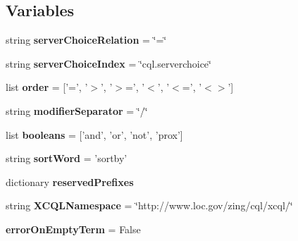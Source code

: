 \subsection*{Variables}
\begin{DoxyCompactItemize}
\item 
\hypertarget{namespacecheshire3_1_1cql_parser_af64d12b2765265d5bd547dfe567afb9c}{string {\bfseries server\-Choice\-Relation} = \char`\"{}=\char`\"{}}\label{namespacecheshire3_1_1cql_parser_af64d12b2765265d5bd547dfe567afb9c}

\item 
\hypertarget{namespacecheshire3_1_1cql_parser_a99a09921c9f500dad45dc168928f0a26}{string {\bfseries server\-Choice\-Index} = \char`\"{}cql.\-serverchoice\char`\"{}}\label{namespacecheshire3_1_1cql_parser_a99a09921c9f500dad45dc168928f0a26}

\item 
\hypertarget{namespacecheshire3_1_1cql_parser_a8a7c3235bbeca560ff1677553c1cbdfe}{list {\bfseries order} = \mbox{[}'=', '$>$', '$>$=', '$<$', '$<$=', '$<$$>$'\mbox{]}}\label{namespacecheshire3_1_1cql_parser_a8a7c3235bbeca560ff1677553c1cbdfe}

\item 
\hypertarget{namespacecheshire3_1_1cql_parser_a4cdfc9d9ef73d190be2d9af8d792f542}{string {\bfseries modifier\-Separator} = \char`\"{}/\char`\"{}}\label{namespacecheshire3_1_1cql_parser_a4cdfc9d9ef73d190be2d9af8d792f542}

\item 
\hypertarget{namespacecheshire3_1_1cql_parser_a5a7616bb34ce5a60de0a7b74cce7907c}{list {\bfseries booleans} = \mbox{[}'and', 'or', 'not', 'prox'\mbox{]}}\label{namespacecheshire3_1_1cql_parser_a5a7616bb34ce5a60de0a7b74cce7907c}

\item 
\hypertarget{namespacecheshire3_1_1cql_parser_af1b0fe898bb693d6c996c79a926754d3}{string {\bfseries sort\-Word} = 'sortby'}\label{namespacecheshire3_1_1cql_parser_af1b0fe898bb693d6c996c79a926754d3}

\item 
dictionary {\bfseries reserved\-Prefixes}
\item 
\hypertarget{namespacecheshire3_1_1cql_parser_a849869b94409127d85263f0c60d87ed6}{string {\bfseries X\-C\-Q\-L\-Namespace} = \char`\"{}http\-://www.\-loc.\-gov/zing/cql/xcql/\char`\"{}}\label{namespacecheshire3_1_1cql_parser_a849869b94409127d85263f0c60d87ed6}

\item 
\hypertarget{namespacecheshire3_1_1cql_parser_a966c5ed62d4ac4c84db80b72868861ff}{{\bfseries error\-On\-Empty\-Term} = False}\label{namespacecheshire3_1_1cql_parser_a966c5ed62d4ac4c84db80b72868861ff}


\end{DoxyCompactItemize}
